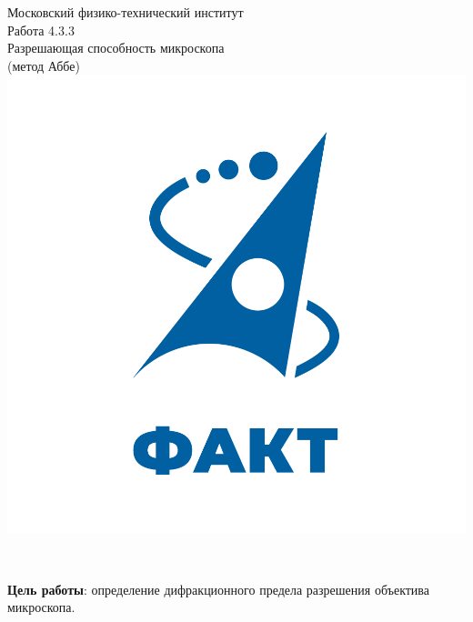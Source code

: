 \documentclass[a4paper,12pt]{article} %
\begin{document}

\begin{titlepage}
\begin{center}
	\large{Московский физико-технический институт}\\
	\vspace{100px}
	\LARGE{Работа 4.3.3}\\
    \LARGE{Разрешающая способность микроскопа\\
    (метод Аббе)}\\
	\vspace{30px}
	\includegraphics[scale = 0.3]{fakt_logo.png}\\
\end{center}

\vfill
\begin{flushright}
	\\
\end{flushright}
\end{titlepage}

\newpage

\tableofcontents

\newpage

\textbf{Цель работы}: определение дифракционного предела разрешения объектива микроскопа.
\end{document}
